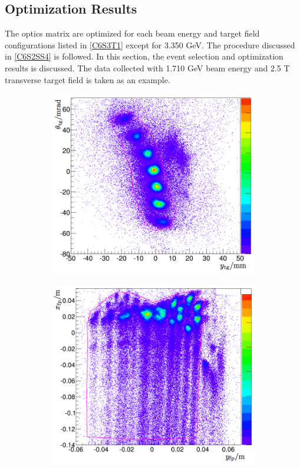 \subsection{Optimization Results}
\label{C6S3SS2}

The optics matrix are optimized for each beam energy and target field configurations listed in \cref{C6S3T1} except for 3.350 GeV. The procedure discussed in \cref{C6S2SS4} is followed. In this section, the event selection and optimization results is discussed. The data collected with 1.710 GeV beam energy and 2.5 T transverse target field is taken as an example.

\begin{figure}[b!]
  \centering
  \begin{subfigure}[t]{0.49\textwidth}
    \includegraphics[width=\textwidth]{figs/foil-cut.png}
  \end{subfigure}
  \begin{subfigure}[t]{0.49\textwidth}
    \includegraphics[width=\textwidth]{figs/focal-plane-cut.png}

\end{subfigure}
\end{figure}
